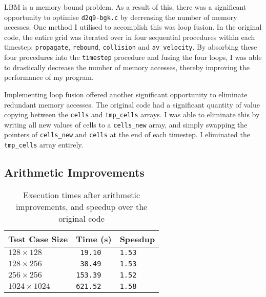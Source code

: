 \documentclass[11pt, twocolumn, a4paper]{article}
\begin{document}
LBM is a memory bound problem.
As a result of this, there was a significant opportunity to optimise \texttt{d2q9-bgk.c} by decreasing the number of memory accesses.
One method I utilised to accomplish this was loop fusion.
In the original code, the entire grid was iterated over in four sequential procedures within each timestep: \texttt{propagate}, \texttt{rebound}, \texttt{collision} and \texttt{av\_velocity}.
By absorbing these four procedures into the \texttt{timestep} procedure and fusing the four loops, I was able to drastically decrease the number of memory accesses, thereby improving the performance of my program.

Implementing loop fusion offered another significant opportunity to eliminate redundant memory accesses.
The original code had a significant quantity of value copying between the \texttt{cells} and \texttt{tmp\_cells} arrays.
I was able to eliminate this by writing all new values of cells to a \texttt{cells\_new} array, and simply swapping the pointers of \texttt{cells\_new} and \texttt{cells} at the end of each timestep.
I eliminated the \texttt{tmp\_cells} array entirely.

\subsection{Arithmetic Improvements}

\begin{table}[htbp]
  \begin{center}
  \caption{Execution times after arithmetic improvements, and speedup over the original code}\label{tab:arithmetic_improvements}
  \begin{tabular}{l | l l} 
      \hline\hline
      Test Case Size&Time (s)&Speedup\\
      \hline
      $128 \times 128$&\texttt{ 19.10}&\texttt{1.53}\\
      $128 \times 256$&\texttt{ 38.49}&\texttt{1.53}\\
      $256 \times 256$&\texttt{153.39}&\texttt{1.52}\\
      $1024 \times 1024$&\texttt{621.52}&\texttt{1.58}\\
      \hline
    \end{tabular}
  \end{center}
\end{table} 
\end{document}
